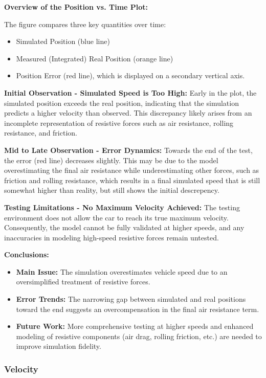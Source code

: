 \documentclass[12pt, titlepage]{article}
\begin{document}
\textbf{Overview of the Position vs. Time Plot:}  

The figure compares three key quantities over time:
\begin{itemize}
    \item Simulated Position (blue line)
    \item Measured (Integrated) Real Position (orange line)
    \item Position Error (red line), which is displayed on a secondary vertical axis.
\end{itemize}

\textbf{Initial Observation - Simulated Speed is Too High:}
Early in the plot, the simulated position exceeds the real position, indicating that the simulation predicts a higher velocity than observed. This discrepancy likely arises from an incomplete representation of resistive forces such as air resistance, rolling resistance, and friction.

\textbf{Mid to Late Observation - Error Dynamics:}  
Towards the end of the test, the error (red line) decreases slightly. This may be due to the model overestimating the final air resistance while underestimating other forces, such as friction and rolling resistance, which results in a final simulated speed that is still somewhat higher than reality, but still shows the initial descrepency.

\textbf{Testing Limitations - No Maximum Velocity Achieved:}  
The testing environment does not allow the car to reach its true maximum velocity. Consequently, the model cannot be fully validated at higher speeds, and any inaccuracies in modeling high-speed resistive forces remain untested.

\textbf{Conclusions:}
\begin{itemize}
    \item \textbf{Main Issue:} The simulation overestimates vehicle speed due to an oversimplified treatment of resistive forces.
    \item \textbf{Error Trends:} The narrowing gap between simulated and real positions toward the end suggests an overcompensation in the final air resistance term.
    \item \textbf{Future Work:} More comprehensive testing at higher speeds and enhanced modeling of resistive components (air drag, rolling friction, etc.) are needed to improve simulation fidelity.
\end{itemize}

\subsubsection{Velocity}
\end{document}
